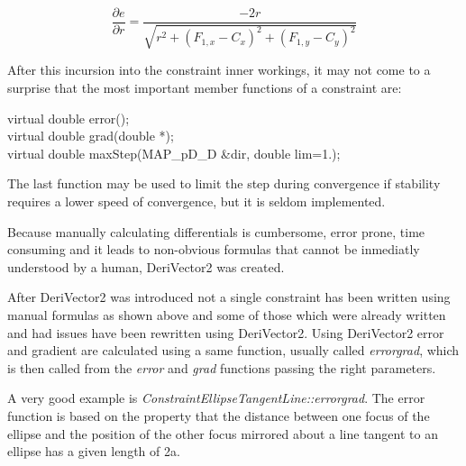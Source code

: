 \documentclass[12pt,twoside,a4paper]{book}
\begin{document}
    \begin{equation}
       \frac{\partial{e}}{\partial{r}}= \frac{-2r}{\sqrt{r^2 + (F_{1,x} - C_x)^2 + (F_{1,y} - C_y)^2}}
    \end{equation}

    After this incursion into the constraint inner workings, it may not come to a surprise that the most important member functions of a constraint are:

    \begin{codequote}
    virtual double error();\\
    virtual double grad(double *);\\
    virtual double maxStep(MAP\_pD\_D \&dir, double lim=1.);
    \end{codequote}

    The last function may be used to limit the step during convergence if stability requires a lower speed of convergence, but it is seldom implemented.

    Because manually calculating differentials is cumbersome, error prone, time consuming and it leads to non-obvious formulas that cannot be inmediatly understood by a human, DeriVector2 was created.

    After DeriVector2 was introduced not a single constraint has been written using manual formulas as shown above and some of those which were already written and had issues have been rewritten using DeriVector2. Using DeriVector2 error and gradient are calculated using a same function, usually called \emph{errorgrad}, which is then called from the \emph{error} and \emph{grad} functions passing the right parameters.

    A very good example is \emph{ ConstraintEllipseTangentLine::errorgrad}. The error function is based on the property that the distance between one focus of the ellipse and the position of the other focus mirrored about a line tangent to an ellipse has a given length of 2a.
\end{document}
